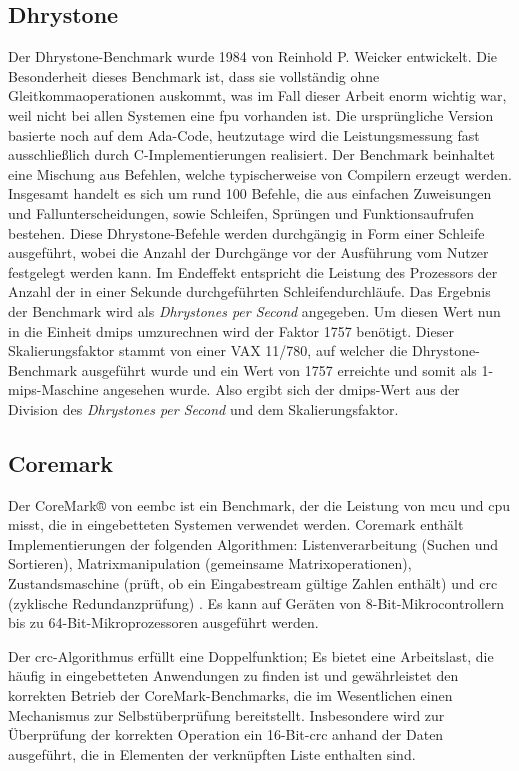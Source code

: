 \subsection{Dhrystone}\label{kap:dhrystone}
Der Dhrystone-Benchmark wurde 1984 von Reinhold P. Weicker entwickelt. Die Besonderheit dieses Benchmark ist, dass sie vollständig
ohne Gleitkommaoperationen auskommt, was im Fall dieser Arbeit enorm wichtig war, weil nicht bei allen Systemen eine \ac{fpu} vorhanden ist.
Die ursprüngliche Version basierte noch auf dem Ada-Code, heutzutage wird die Leistungsmessung fast ausschließlich durch C-Implementierungen
 realisiert. Der Benchmark beinhaltet eine Mischung aus Befehlen, welche typischerweise von Compilern erzeugt werden. Insgesamt handelt es sich
 um rund 100 Befehle, die aus einfachen Zuweisungen und Fallunterscheidungen, sowie Schleifen, Sprüngen und Funktionsaufrufen bestehen.
  Diese Dhrystone-Befehle werden durchgängig in Form einer Schleife ausgeführt, wobei die Anzahl der Durchgänge vor der Ausführung vom
  Nutzer festgelegt werden kann. Im Endeffekt entspricht die Leistung des Prozessors der Anzahl der in einer Sekunde durchgeführten Schleifendurchläufe.
  Das Ergebnis der Benchmark wird als \emph{Dhrystones per Second} angegeben. Um diesen Wert nun in die Einheit \ac{dmips} umzurechnen wird der Faktor 1757 benötigt. Dieser Skalierungsfaktor
  stammt von einer VAX 11/780, auf welcher die Dhrystone-Benchmark ausgeführt wurde und ein Wert von 1757 erreichte und somit als 1-\ac{mips}-Maschine angesehen wurde. Also ergibt sich der
  \ac{dmips}-Wert aus der Division des \emph{Dhrystones per Second} und dem Skalierungsfaktor.~\cite{benchmark}

  \subsection{Coremark}\label{kap:coremark}
  Der CoreMark® von \ac{eembc} ist ein Benchmark, der die Leistung von \ac{mcu} und \ac{cpu} misst, die in eingebetteten Systemen verwendet werden.
   Coremark enthält Implementierungen der folgenden Algorithmen: Listenverarbeitung (Suchen und Sortieren),
    Matrixmanipulation (gemeinsame Matrixoperationen), Zustandsmaschine (prüft, ob ein Eingabestream gültige Zahlen enthält) und \ac{crc} (zyklische Redundanzprüfung) .
    Es kann auf Geräten von 8-Bit-Mikrocontrollern bis zu 64-Bit-Mikroprozessoren ausgeführt werden.

  Der \ac{crc}-Algorithmus erfüllt eine Doppelfunktion; Es bietet eine Arbeitslast, die häufig in eingebetteten Anwendungen zu finden ist
  und gewährleistet den korrekten Betrieb der CoreMark-Benchmarks, die im Wesentlichen einen Mechanismus zur Selbstüberprüfung bereitstellt.
   Insbesondere wird zur Überprüfung der korrekten Operation ein 16-Bit-\ac{crc} anhand der Daten ausgeführt, die in Elementen der verknüpften Liste enthalten sind.

